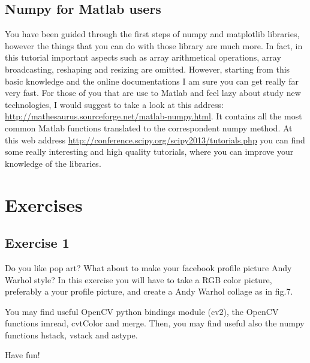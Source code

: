 \documentclass[aps,letterpaper,10pt]{revtex4}
\begin{document}
\subsection{Numpy for Matlab users}
You have been guided through the first steps of numpy and matplotlib libraries, however the things that you can do with those library are much more. In fact, in this tutorial important aspects such as array arithmetical operations, array broadcasting, reshaping and resizing are omitted. However, starting from this basic knowledge and the online documentations I am sure you can get really far very fast. For those of you that are use to Matlab and feel lazy about study new technologies, I would suggest to take a look at this address: \href{http://mathesaurus.sourceforge.net/matlab-numpy.html}{http://mathesaurus.sourceforge.net/matlab-numpy.html}. It contains all the most common Matlab functions translated to the correspondent numpy method. At this web address \href{http://conference.scipy.org/scipy2013/tutorials.php}{http://conference.scipy.org/scipy2013/tutorials.php} you can find some really interesting and high quality tutorials, where you can improve your knowledge of the libraries. 

\section{Exercises}
\subsection{Exercise 1}
Do you like pop art? What about to make your facebook profile picture Andy Warhol style? In this exercise you will have to take a RGB color picture, preferably a your profile picture, and create a Andy Warhol collage as in fig.7.

You may find useful OpenCV python bindings module (cv2), the OpenCV functions imread, cvtColor and merge. Then, you may find useful also the numpy functions hstack, vstack and astype.

Have fun!
\end{document}
